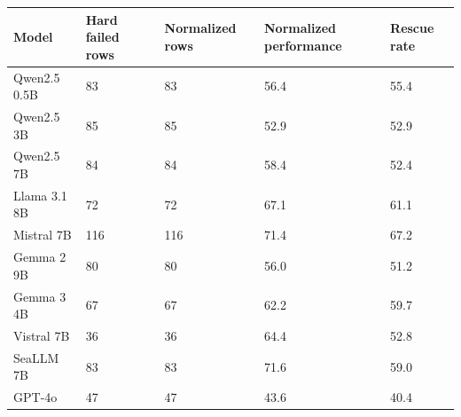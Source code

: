 \begin{tabular}{lllll}
\toprule
Model & Hard failed rows & Normalized rows & Normalized performance & Rescue rate \\
\midrule
Qwen2.5 0.5B & 83 & 83 & 56.4 & 55.4 \\
Qwen2.5 3B & 85 & 85 & 52.9 & 52.9 \\
Qwen2.5 7B & 84 & 84 & 58.4 & 52.4 \\
Llama 3.1 8B & 72 & 72 & 67.1 & 61.1 \\
Mistral 7B & 116 & 116 & 71.4 & 67.2 \\
Gemma 2 9B & 80 & 80 & 56.0 & 51.2 \\
Gemma 3 4B & 67 & 67 & 62.2 & 59.7 \\
Vistral 7B & 36 & 36 & 64.4 & 52.8 \\
SeaLLM 7B & 83 & 83 & 71.6 & 59.0 \\
GPT-4o & 47 & 47 & 43.6 & 40.4 \\
\bottomrule
\end{tabular}
